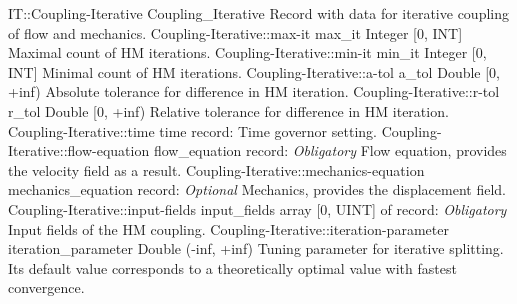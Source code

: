 \begin{RecordType}
	{IT::Coupling-Iterative}
	{Coupling{\_}Iterative}
	{}%
	{}%
	{{{Record with data for iterative coupling of flow and mechanics.}%
}}
		\RecKey
			{Coupling-Iterative::max-it}
			{max{\_}it}
			{{Integer [0, INT]}}{}
			{ }
			{{{Maximal count of HM iterations.}%
}}
		\RecKey
			{Coupling-Iterative::min-it}
			{min{\_}it}
			{{Integer [0, INT]}}{}
			{ }
			{{{Minimal count of HM iterations.}%
}}
		\RecKey
			{Coupling-Iterative::a-tol}
			{a{\_}tol}
			{{Double [0, +inf)}}{}
			{ }
			{{{Absolute tolerance for difference in HM iteration.}%
}}
		\RecKey
			{Coupling-Iterative::r-tol}
			{r{\_}tol}
			{{Double [0, +inf)}}{}
			{ }
			{{{Relative tolerance for difference in HM iteration.}%
}}
		\RecKey
			{Coupling-Iterative::time}
			{time}
			{{record: }}{}
			{ \ValueDefault{{\{}{\}}}}
			{{{Time governor setting.}%
}}
		\RecKey
			{Coupling-Iterative::flow-equation}
			{flow{\_}equation}
			{{record: }}{}
			{ \it{Obligatory}}
			{{{Flow equation, provides the velocity field as a result.}%
}}
		\RecKey
			{Coupling-Iterative::mechanics-equation}
			{mechanics{\_}equation}
			{{record: }}{}
			{ \it{Optional}}
			{{{Mechanics, provides the displacement field.}%
}}
		\RecKey
			{Coupling-Iterative::input-fields}
			{input{\_}fields}
			{{array [0, UINT] of }{record: }}{}
			{ \it{Obligatory}}
			{{{Input fields of the HM coupling.}%
}}
		\RecKey
			{Coupling-Iterative::iteration-parameter}
			{iteration{\_}parameter}
			{{Double (-inf, +inf)}}{}
			{ }
			{{{Tuning parameter for iterative splitting.
Its default value corresponds to a theoretically optimal value with fastest convergence.}%
}}
\end{RecordType}
